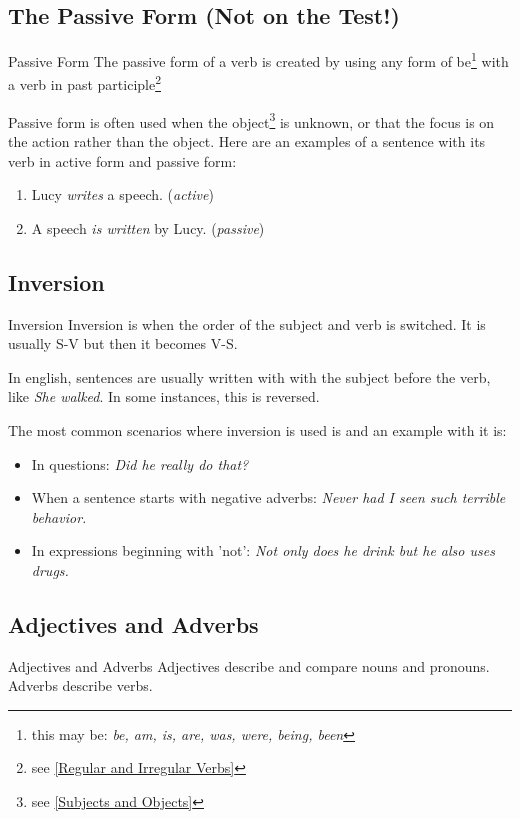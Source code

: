 \newpage
\subsection{The Passive Form (Not on the Test!)}
\begin{definition}{Passive Form}{}
    The passive form of a verb is created by using any form of be\footnote{this may be: \textit{be, am, is, are, was, were, being, been}} with a verb in past participle\footnote{see \ref{Regular and Irregular Verbs}}
\end{definition}
Passive form is often used when the object\footnote{see \ref{Subjects and Objects}} is unknown, or that the focus is on the action rather than the object. Here are an examples of a sentence with its verb in active form and passive form:

\begin{enumerate}
    \item Lucy \textit{writes} a speech. (\textit{active})
    \item A speech \textit{is written} by Lucy. (\textit{passive})
\end{enumerate}

\newpage
\subsection{Inversion}
\begin{definition}{Inversion}{}
    Inversion is when the order of the subject and verb is switched. It is usually S-V but then it becomes V-S.
\end{definition}
In english, sentences are usually written with with the subject before the verb, like \textit{She walked}. In some instances, this is reversed.

The most common scenarios where inversion is used is and an example with it is:
\begin{itemize}
    \item In questions: \textit{Did he really do that?}
    \item When a sentence starts with negative adverbs: \textit{Never had I seen such terrible behavior.}
    \item In expressions beginning with 'not': \textit{Not only does he drink but he also uses drugs.} 
\end{itemize}

\newpage
\subsection{Adjectives and Adverbs}
\begin{definition}{Adjectives and Adverbs}{}
    Adjectives describe and compare nouns and pronouns. Adverbs describe verbs.
\end{definition}

